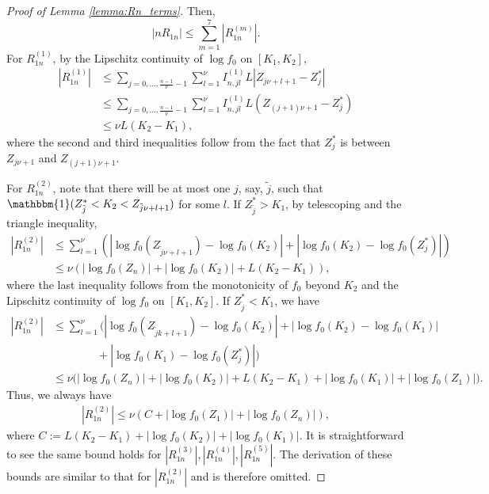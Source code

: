 \documentclass[10pt,a4paper]{amsart}
\begin{document}
\begin{proof}[Proof of Lemma \ref{lemma:Rn_terms}]
Then,
\begin{equation*}
|nR_{1n}| \leq  \sum^7_{m=1}|R^{(m)}_{1n}|.
\end{equation*}
%
For $R^{(1)}_{1n}$, by the Lipschitz continuity of $\log f_0$ on $[K_1, K_2]$, 
\begin{align*}
    |R^{(1)}_{1n}|& \leq \sum_{j=0,\ldots, \frac{n-1}{\nu}-1} \sum^\nu_{l=1}  I^{(1)}_{n,jl} L \left| Z_{j\nu+l+1} - Z^*_j  \right|\\
    & \leq \sum_{j=0,\ldots, \frac{n-1}{\nu}-1} \sum^\nu_{l=1}  I^{(1)}_{n,jl} L(Z_{(j+1)\nu+1} - Z^*_j ) \\
    & \leq  \nu L(K_2 - K_1),
\end{align*}
where the second and third inequalities follow from the fact that $Z^*_j$ is between $Z_{j\nu+1}$ and $Z_{(j+1)\nu+1}$.

		
For $R^{(2)}_{1n}$, note that there will be at most one $j$, say, $\tilde{j}$, such that $\mathbbm{1}( Z^*_{\tilde{j}} < K_2 < Z_{\tilde{j}\nu+l+1})$ for some $l$. If $Z^*_{\tilde{j}} > K_1$, by telescoping and the triangle inequality,
\begin{align*}
    |R^{(2)}_{1n}|	 & \leq \sum^\nu_{l=1}\left( |\log f_0(Z_{\tilde{j} \nu+l+1}) - \log f_0(K_2)| + |\log f_0(K_2) - \log f_0(Z^*_j)|\right)\\
    &\leq \nu (|\log f_0(Z_n)| + |\log f_0(K_2)| + L(K_2 - K_1)),
\end{align*}
		where the last inequality follows from the monotonicity of $f_0$ beyond $K_2$ and the Lipschitz continuity of $\log f_0$ on $[K_1, K_2]$. 
		If $Z^*_{\tilde{j}} < K_1$, we have
		\begin{align*}
			|R^{(2)}_{1n}|	 & \leq \sum^\nu_{l=1}\bigg(  |\log f_0(Z_{\tilde{j} k+l+1}) - \log f_0(K_2)| + |\log f_0(K_2) - \log f_0(K_1)|\\
			& \quad  \quad  \quad  \quad + |\log f_0(K_1) - \log f_0(Z^*_j)|\bigg)\\
			&\leq \nu\bigg(|\log f_0(Z_n)| + |\log f_0(K_2)| + L(K_2-K_1) +  |\log f_0(K_1)| +  |\log f_0(Z_1)|\bigg).
		\end{align*}
		Thus, we always have
		\begin{align*}
			|R^{(2)}_{1n}| \leq \nu (C + |\log f_0(Z_1)|+|\log f_0(Z_n)|),
		\end{align*}
		where $C := L(K_2-K_1) + |\log f_0(K_2)| + |\log f_0(K_1)|$. It is straightforward to see the same bound holds for $|R^{(3)}_{1n}|, |R^{(4)}_{1n}|, |R^{(5)}_{1n}|$. The derivation of these bounds are similar to that for $|R^{(2)}_{1n}|$ and is therefore omitted.
		

\end{proof}
\end{document}
